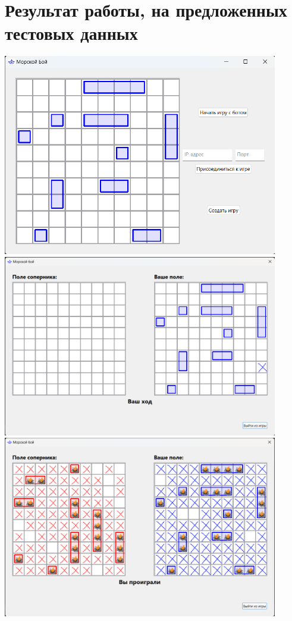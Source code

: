 \documentclass[a4paper,14pt]{extarticle}
\begin{document}
\section{Результат работы, на предложенных тестовых данных}
\begin{center}
    \includegraphics[width=12cm]{game1.png}
    \includegraphics[width=12cm]{game2.png}
    \includegraphics[width=12cm]{game3.png}
\end{center}
\end{document}
